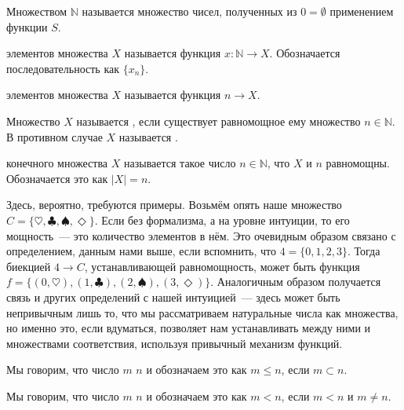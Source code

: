 \begin{definition}
Множеством  $\mathbb{N}$ называется множество чисел, полученных из $0=\emptyset$ применением функции $S$.
\end{definition}

\begin{definition}
 элементов множества $X$ называется функция $x:\mathbb{N}\to X$. Обозначается последовательность как $\{x_n\}$.
\end{definition}

\begin{definition}
 элементов множества $X$ называется функция $n \to X$.
\end{definition}

\begin{definition}
Множество $X$ называется , если существует равномощное ему множество $n\in\mathbb{N}$. В противном случае $X$ называется .
\end{definition}

\begin{definition}
 конечного множества $X$ называется такое число $n\in \mathbb{N}$, что $X$ и $n$ равномощны. Обозначается это как $|X| = n$.
\end{definition}

Здесь, вероятно, требуются примеры. Возьмём опять наше множество $C=\{\heartsuit, \clubsuit, \spadesuit, \Diamond\}$. Если без формализма, а на уровне интуиции, то его мощность~--- это количество элементов в нём. Это очевидным образом связано с определением, данным нами выше, если вспомнить, что $4 = \{0, 1, 2, 3\}$. Тогда биекцией $4\to C$, устанавливающей равномощность, может быть функция $f = \{(0, \heartsuit), (1, \clubsuit), (2, \spadesuit), (3, \Diamond)\}$. Аналогичным образом получается связь и других определений с нашей интуицией~--- здесь может быть непривычным лишь то, что мы рассматриваем натуральные числа как множества, но именно это, если вдуматься, позволяет нам устанавливать между ними и множествами соответствия, используя привычный механизм функций.

\begin{definition}
Мы говорим, что число $m$  $n$ и обозначаем это как $m\le n$, если $m\subset n$.
\end{definition}

\begin{definition}
Мы говорим, что число $m$  $n$ и обозначаем это как $m<n$, если $m< n$ и $m \not= n$.
\end{definition}

